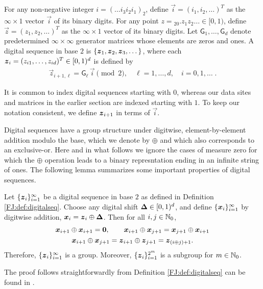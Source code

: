\documentclass[graybox,footinfo]{svmult}
\begin{document}
\begin{definition} \label{FJ:def:digitalseq}
	For any non-negative integer $i = (\dots i_3 i_2 i_1)_2$, define $\overrightarrow{i} = (i_1, i_2, \dots)^T$ as the $\infty \times 1$ vector $\overrightarrow{i}$ of its binary digits. 
	For any point $z = {}_20.z_1 z_2 \dots \in [0, 1)$, define $\overrightarrow{z} = (z_1, z_2, \dots)^T$ as the $\infty \times 1$ vector of its binary digits. 
	Let $ \mathsf{G}_1, \dots , \mathsf{G}_d$ denote predetermined $\infty \times \infty$ generator matrices whose elements are zeros and ones. 
	A digital sequence in base $2$ is $\{{\boldsymbol{z}}_1, {\boldsymbol{z}}_2, {\boldsymbol{z}}_3, \dots\}$, where each ${\boldsymbol{z}}_i = ( z_{i1}, \dots , z_{id})^T \in [0, 1)^d$ is defined by
	\begin{align*}
	\overrightarrow{z}_{i+1,\ell} = \mathsf{G}_{\ell} \, \overrightarrow{i} \pmod 2,  \quad \ell = 1, \dots, d, \quad i = 0, 1, \dots \;.
	\end{align*}
\end{definition}

It is common to index digital sequences starting with $0$, whereas our data sites and matrices in the earlier section are indexed starting with $1$.  To keep our notation consistent, we define ${\boldsymbol{z}}_{i+1}$ in terms of $\overrightarrow{i}$.

Digital sequences have a group structure under digitwise, element-by-element addition modulo the base, which we denote by $\oplus$ and which also corresponds to an exclusive-or. Here and in what follows we ignore the cases of measure zero for which the $\oplus$ operation leads to a binary represntation ending in an infinite string of ones.  The following lemma summarizes some important properties of digital sequences. 


\begin{lemma}
	\label{FJ:lemma:digital_net_prop}
	Let $\{{\boldsymbol{z}}_i\}_{i=1}^{\infty}$ be a digital sequence in base $2$ as defined in Definition \ref{FJ:def:digitalseq}.  Choose any digital shift ${\boldsymbol{\Delta}} \in [0,1)^d$, and define $\{{\boldsymbol{x}}_i\}_{i=1}^{\infty}$ by digitwise addition, ${\boldsymbol{x}}_{i} = {\boldsymbol{z}}_{i} \oplus {\boldsymbol{\Delta}}$.
	Then for all $i,j \in {\mathbb{N}}_0$,
	\begin{gather}
		\label{FJ:eqn:digital_net_symmetric_prop}
	\bsx_{i+1} \oplus \bsx_{i+1} = \boldsymbol{0}, \qquad 
	\bsx_{i+1} \oplus \bsx_{j+1} = \bsx_{j+1} \oplus \bsx_{i+1} \\
	\label{FJ:eqn:digital_shift_prop}
	\bsx_{i+1} \oplus \bsx_{j+1} = \bsz_{i+1} \oplus \bsz_{j+1} = \bsz_{(i \oplus j) + 1 }.
	\end{gather}
	Therefore, $\{{\boldsymbol{z}}_i\}_{i=1}^{\infty}$ is a group.  Moreover, $\{{\boldsymbol{z}}_i\}_{i=1}^{2^m}$ is a subgroup for $m \in {{\mathbb{N}}}_0$.
\end{lemma}
The proof follows straightforwardly from Definition \ref{FJ:def:digitalseq} can be found in \cite{JagThesis19a}.
\end{document}

